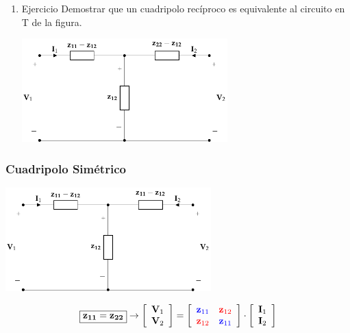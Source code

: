 \begin{enumerate}
\item Ejercicio
\label{sec:org3cfa18b}
Demostrar que un cuadripolo recíproco es equivalente al circuito en T de la figura.
\begin{center}
\includegraphics[height=4cm]{../figs/circuitoEquivalenteZReciproco.pdf}
\end{center}
\end{enumerate}

\subsubsection{Cuadripolo Simétrico}
\label{sec:orga8e8529}
\begin{center}
\includegraphics[height=4cm]{../figs/circuitoEquivalenteZSimetrico.pdf}
\end{center}

\[
\boxed{\mathbf{z_{11}} = \mathbf{z_{22}}}
\rightarrow
\left[
    \begin{array}{c}
      \mathbf{V}_1\\
      \mathbf{V}_2
    \end{array}
  \right] =
  \left[
    \begin{array}{cc}
      \color{blue}{\mathbf{z}_{11}} & \color{red}{\mathbf{z}_{12}}\\
      \color{red}{\mathbf{z}_{12}} & \color{blue}{\mathbf{z}_{11}}
    \end{array}
  \right] \cdot
  \left[
    \begin{array}{c}
      \mathbf{I}_1\\
      \mathbf{I}_2
    \end{array}
  \right]
\]


